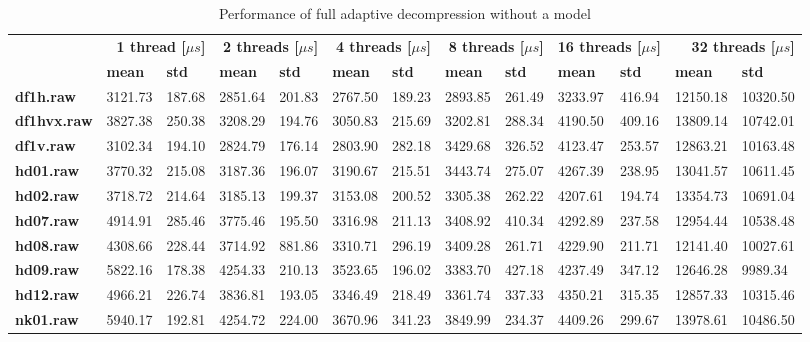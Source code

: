 \begin{table}
\centering
\small
\begin{tabular}{l|ll|ll|ll|ll|ll|ll}
    & \multicolumn{2}{r|}{\textbf{1 thread [$\mu s$]}} & \multicolumn{2}{r|}{\textbf{2 threads [$\mu s$]}} & \multicolumn{2}{r|}{\textbf{4 threads [$\mu s$]}} & \multicolumn{2}{r|}{\textbf{8 threads [$\mu s$]}} & \multicolumn{2}{r|}{\textbf{16 threads [$\mu s$]}} & \multicolumn{2}{r}{\textbf{32 threads [$\mu s$]}} \\
    & \textbf{mean} & \textbf{std} & \textbf{mean} & \textbf{std} & \textbf{mean} & \textbf{std} & \textbf{mean} & \textbf{std} & \textbf{mean} & \textbf{std} & \textbf{mean} & \textbf{std} \\
\hline
    \textbf{df1h.raw} & 3121.73 & 187.68 & 2851.64 & 201.83 & 2767.50 & 189.23 & 2893.85 & 261.49 & 3233.97 & 416.94 & 12150.18 & 10320.50 \\
    \textbf{df1hvx.raw} & 3827.38 & 250.38 & 3208.29 & 194.76 & 3050.83 & 215.69 & 3202.81 & 288.34 & 4190.50 & 409.16 & 13809.14 & 10742.01 \\
    \textbf{df1v.raw} & 3102.34 & 194.10 & 2824.79 & 176.14 & 2803.90 & 282.18 & 3429.68 & 326.52 & 4123.47 & 253.57 & 12863.21 & 10163.48 \\
    \textbf{hd01.raw} & 3770.32 & 215.08 & 3187.36 & 196.07 & 3190.67 & 215.51 & 3443.74 & 275.07 & 4267.39 & 238.95 & 13041.57 & 10611.45 \\
    \textbf{hd02.raw} & 3718.72 & 214.64 & 3185.13 & 199.37 & 3153.08 & 200.52 & 3305.38 & 262.22 & 4207.61 & 194.74 & 13354.73 & 10691.04 \\
    \textbf{hd07.raw} & 4914.91 & 285.46 & 3775.46 & 195.50 & 3316.98 & 211.13 & 3408.92 & 410.34 & 4292.89 & 237.58 & 12954.44 & 10538.48 \\
    \textbf{hd08.raw} & 4308.66 & 228.44 & 3714.92 & 881.86 & 3310.71 & 296.19 & 3409.28 & 261.71 & 4229.90 & 211.71 & 12141.40 & 10027.61 \\
    \textbf{hd09.raw} & 5822.16 & 178.38 & 4254.33 & 210.13 & 3523.65 & 196.02 & 3383.70 & 427.18 & 4237.49 & 347.12 & 12646.28 & 9989.34 \\
    \textbf{hd12.raw} & 4966.21 & 226.74 & 3836.81 & 193.05 & 3346.49 & 218.49 & 3361.74 & 337.33 & 4350.21 & 315.35 & 12857.33 & 10315.46 \\
    \textbf{nk01.raw} & 5940.17 & 192.81 & 4254.72 & 224.00 & 3670.96 & 341.23 & 3849.99 & 234.37 & 4409.26 & 299.67 & 13978.61 & 10486.50 \\
\end{tabular}
\caption{Performance of full adaptive decompression without a model}
\end{table}
